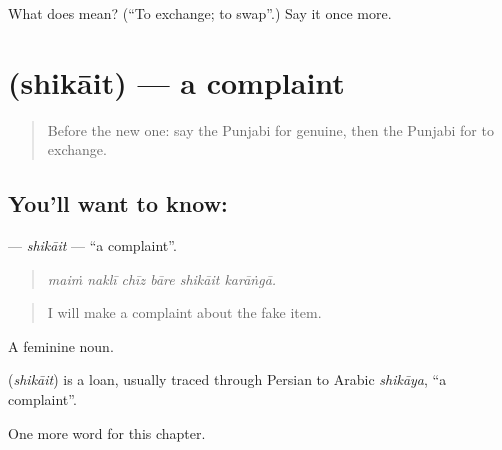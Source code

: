 \begin{tcolorbox}[breakable,colback=teal!4,colframe=teal!35!black,title={Before you move on}]
What does  mean? (\textquotedblleft{}To exchange; to swap\textquotedblright{}.) Say it once more.
\end{tcolorbox}
\section[\texorpdfstring{\pa{ਸ਼ਿਕਾਇਤ} (shikāit)}{ਸ਼ਿਕਾਇਤ (shikāit)}]{ (shikāit) — a complaint}

\label{lesson:PA-C279-shikait}



\begin{quote}
Before the new one: say the Punjabi for genuine, then the Punjabi for to exchange.
\end{quote}

\subsection*{You'll want to know: }
\textbf{} — \emph{shikāit} — \textquotedblleft{}a complaint\textquotedblright{}.

\begin{quote}
     
\end{quote}

\begin{quote}
\emph{maiṁ naklī chīz bāre shikāit karāṅgā.}
\end{quote}

\begin{quote}
I will make a complaint about the fake item.
\end{quote}

A feminine noun.

\begin{cousinweb}
\textbf{} (\emph{shikāit}) is a loan, usually traced through Persian to Arabic \emph{shikāya}, \textquotedblleft{}a complaint\textquotedblright{}.
\end{cousinweb}

\begin{grammarlens}[title={What you've built}]
One more word for this chapter.
\end{grammarlens}

